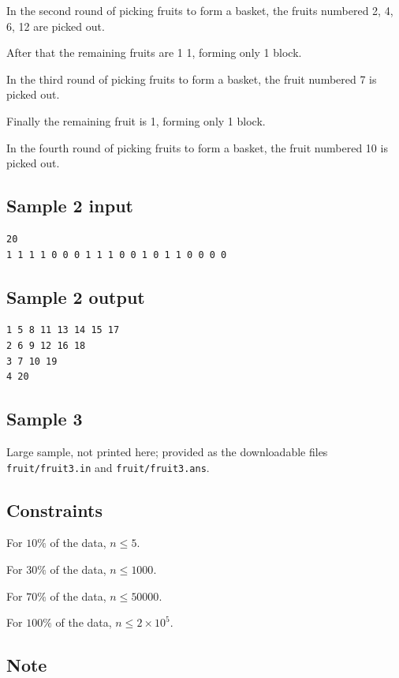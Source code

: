 \documentclass[11pt]{article}
\begin{document}
In the second round of picking fruits to form a basket, the fruits numbered
2, 4, 6, 12 are picked out.

After that the remaining fruits are 1 1, forming only 1 block.

In the third round of picking fruits to form a basket, the fruit numbered 7
is picked out.

Finally the remaining fruit is 1, forming only 1 block.

In the fourth round of picking fruits to form a basket, the fruit numbered
10 is picked out.

\subsection*{Sample 2 input}

\begin{verbatim}
20
1 1 1 1 0 0 0 1 1 1 0 0 1 0 1 1 0 0 0 0
\end{verbatim}

\subsection*{Sample 2 output}

\begin{verbatim}
1 5 8 11 13 14 15 17
2 6 9 12 16 18
3 7 10 19
4 20
\end{verbatim}

\subsection*{Sample 3}

Large sample, not printed here;
provided as the downloadable files \texttt{fruit/fruit3.in} and \texttt{fruit/fruit3.ans}.

\subsection*{Constraints}

For $10\%$ of the data, $n \le 5$.

For $30\%$ of the data, $n \le 1000$.

For $70\%$ of the data, $n \le 50000$.

For $100\%$ of the data, $n \le 2 \times 10^5$.

\subsection*{Note}
\end{document}
